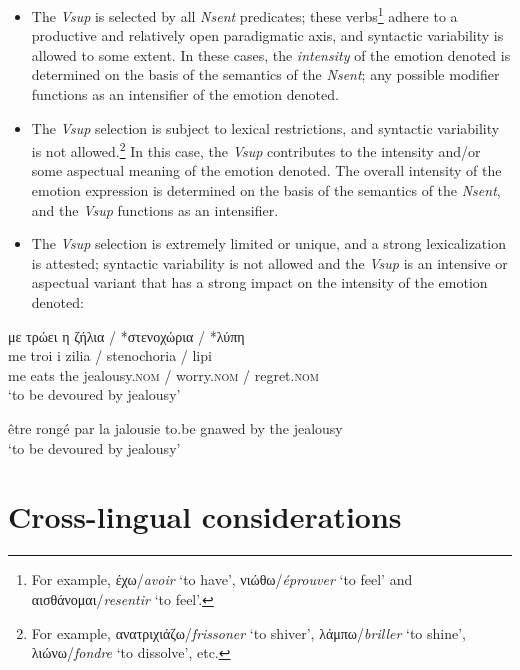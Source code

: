 \documentclass[output=paper]{langsci/langscibook}
\begin{document}
\begin{itemize}
\item 
The \textit{Vsup} is selected by all \textit{Nsent }predicates; these
verbs\footnote{For example, έχω/\textit{avoir} ‘to have’,
νιώθω/\textit{éprouver} ‘to feel’ and
αισθάνομαι/\textit{resentir} ‘to feel’.} adhere to a
productive and relatively open paradigmatic axis, and syntactic
variability is allowed to some extent. In these cases, the
\textit{intensity} of the emotion denoted is determined on the basis of
the semantics of the \textit{Nsent}; any possible modifier functions as
an intensifier of the emotion denoted. 
\item 
The \textit{Vsup} selection is subject to lexical restrictions, and
syntactic variability is not allowed.\footnote{For example,
ανατριχιάζω/\textit{frissoner} ‘to shiver’, λάμπω/\textit{briller} ‘to shine’,
λιώνω/\textit{fondre} ‘to dissolve’, etc.} In this case, the \textit{Vsup}
contributes to the intensity and/or some aspectual
meaning of the emotion denoted. The overall intensity of the
emotion expression is determined on the basis of the semantics of the
\textit{Nsent}, and the \textit{Vsup} functions as an intensifier.
\item 
The \textit{Vsup }selection is extremely limited or unique, and a strong
lexicalization is attested; syntactic variability is not allowed and
the \textit{Vsup} is an intensive or aspectual variant that has a
strong impact on the intensity of the emotion denoted:
\end{itemize}


\begin{exe}
\ex \label{ex:3:45}
\glll με τρώει η ζήλια / *στενοχώρια / *λύπη \\
me  troi i zilia / stenochoria / lipi\\
me eats the jealousy.\textsc{nom} /  worry.\textsc{nom} / regret.\textsc{nom}\\
\glt %
‘to be devoured by jealousy’
\end{exe}

\begin{exe}
\ex \label{ex:3:46} être rongé par la jalousie
\glt  to.be gnawed by the jealousy\\
‘to be devoured by jealousy’
\end{exe}



\section{Cross-lingual considerations}
\end{document}
